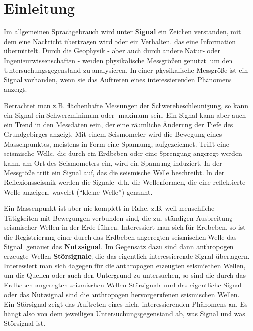 \chapter{Einleitung}

Im allgemeinen Sprachgebrauch wird unter {\bf Signal} ein Zeichen verstanden, mit dem eine Nachricht übertragen wird oder ein Verhalten, das eine Information übermittelt. Durch die Geophysik - aber auch durch andere Natur- oder Ingenieurwissenschaften - werden physikalische Messgrößen genutzt, um den Untersuchungsgegenstand zu analysieren. In einer physikalische Messgröße ist ein Signal vorhanden, wenn sie das Auftreten eines interessierenden Phänomens anzeigt. 

Betrachtet man z.B. flächenhafte Messungen der Schwerebeschleunigung, so kann ein Signal ein Schwereminimum oder -maximum sein. Ein Signal kann aber auch ein Trend in den Messdaten sein, der eine räumliche Änderung der Tiefe des Grundgebirges anzeigt. Mit einem Seismometer wird die  Bewegung eines Massenpunktes, meistens in Form eine Spannung, aufgezeichnet. Trifft eine seismische Welle, die durch ein Erdbeben oder eine Sprengung angeregt werden kann, am Ort des Seismometers ein, wird ein Spannung induziert. In der Messgröße tritt ein Signal auf, das die seismische Welle beschreibt. In der Reflexionsseismik werden die Signale, d.h. die Wellenformen, die eine reflektierte Welle anzeigen, wavelet (``kleine Welle'') genannt. 

Ein Massenpunkt ist aber nie komplett in Ruhe, z.B. weil menschliche Tätigkeiten mit Bewegungen verbunden sind, die zur ständigen Ausbreitung seismischer Wellen in der Erde führen. Interessiert man sich für Erdbeben, so ist die Registrierung einer durch das Erdbeben angeregten seismischen Welle das Signal, genauer das {\bf Nutzsignal}. Im Gegensatz dazu sind dann anthropogen erzeugte Wellen {\bf Störsignale}, die das eigentlich interessierende Signal überlagern. Interessiert man sich dagegen für die anthropogen erzeugten seismischen Wellen, um die Quellen oder auch den Untergrund zu untersuchen, so sind die durch das Erdbeben angeregten seismischen Wellen Störsignale und das eigentliche Signal oder das Nutzsignal sind die anthropogen hervorgerufenen seismischen Wellen. Ein Störsignal zeigt das Auftreten eines nicht interessierenden Phänomens an. Es hängt also von dem jeweiligen Untersuchungsgegenstand ab, was Signal und was Störsignal ist.


